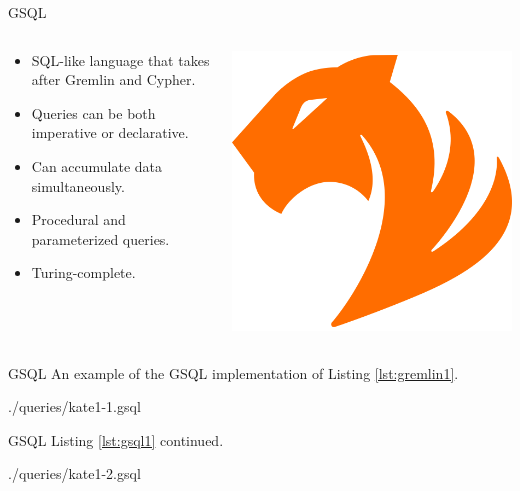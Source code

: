 \begin{frame}{GSQL}
    \begin{columns}
        \begin{column}{.6\textwidth}
            \begin{itemize}
                \item SQL-like language that takes after Gremlin and Cypher.
                \item Queries can be both imperative or declarative.
                \item Can accumulate data simultaneously.
                \item Procedural and parameterized queries.
                \item Turing-complete.
            \end{itemize}
            \end{column}%
            \hfill%
            \begin{column}{.39\textwidth}
            \centering
            \includegraphics[width=0.7\columnwidth]{img/database-logos/tigergraph.png}
        \end{column}%
    \end{columns}
\end{frame}

\begin{frame}{GSQL}
    An example of the GSQL implementation of Listing \ref{lst:gremlin1}.

    {./queries/kate1-1.gsql}
\end{frame}

\begin{frame}{GSQL}
    Listing \ref{lst:gsql1} continued.

    {./queries/kate1-2.gsql}
\end{frame}